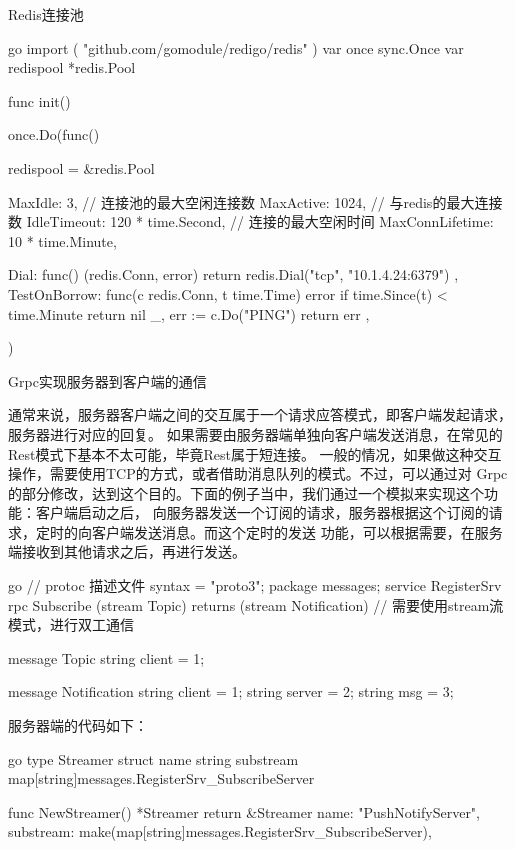 \begin{outline}[enumerate]
  \1 Redis连接池
\begin{code-in-enumerate}{go}
import (
    "github.com/gomodule/redigo/redis"
)
var once sync.Once
var redispool *redis.Pool

func init() {
    once.Do(func() {
        redispool = &redis.Pool{
            MaxIdle:         3,                 // 连接池的最大空闲连接数
            MaxActive:       1024,              // 与redis的最大连接数
            IdleTimeout:     120 * time.Second, // 连接的最大空闲时间
            MaxConnLifetime: 10 * time.Minute,

            Dial: func() (redis.Conn, error) {
                return redis.Dial("tcp", "10.1.4.24:6379")
            },
            TestOnBorrow: func(c redis.Conn, t time.Time) error {
                if time.Since(t) < time.Minute {
                    return nil
                }
                _, err := c.Do("PING")
                return err
            },
        }
    })
}
\end{code-in-enumerate}

  \1 Grpc实现服务器到客户端的通信

  通常来说，服务器客户端之间的交互属于一个请求应答模式，即客户端发起请求，服务器进行对应的回复。
  如果需要由服务器端单独向客户端发送消息，在常见的Rest模式下基本不太可能，毕竟Rest属于短连接。
  一般的情况，如果做这种交互操作，需要使用TCP的方式，或者借助消息队列的模式。不过，可以通过对
  Grpc的部分修改，达到这个目的。下面的例子当中，我们通过一个模拟来实现这个功能：客户端启动之后，
  向服务器发送一个订阅的请求，服务器根据这个订阅的请求，定时的向客户端发送消息。而这个定时的发送
  功能，可以根据需要，在服务端接收到其他请求之后，再进行发送。
\begin{code-in-enumerate}{go}
// protoc 描述文件
syntax = "proto3";
package messages;
service RegisterSrv{
    rpc Subscribe (stream Topic) returns (stream Notification) {} // 需要使用stream流模式，进行双工通信
}

message Topic {
    string client = 1;
}

message Notification {
    string client = 1;
    string server = 2;
    string msg = 3;
}
\end{code-in-enumerate}

  服务器端的代码如下：
\begin{code-in-enumerate}{go}
type Streamer struct {
    name      string
    substream map[string]messages.RegisterSrv_SubscribeServer
}

func NewStreamer() *Streamer {
    return &Streamer{
        name:      "PushNotifyServer",
        substream: make(map[string]messages.RegisterSrv_SubscribeServer),
    }
}


\end{code-in-enumerate}
\end{outline}
